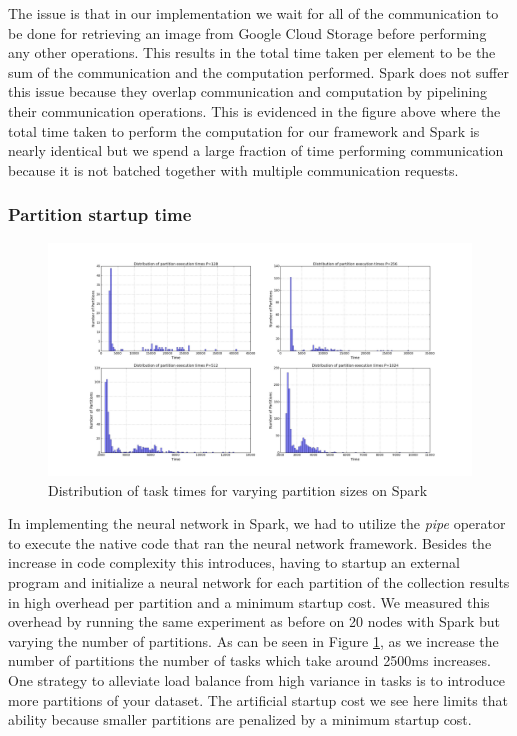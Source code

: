 \documentclass[tog]{acmsiggraph}
\begin{document}
The issue is that in our implementation we wait for all of the communication to
be done for retrieving an image from Google Cloud Storage before performing any
other operations. This results in the total time taken per element to be the
sum of the communication and the computation performed. Spark does not suffer
this issue because they overlap communication and computation by pipelining
their communication operations. This is evidenced in the figure above where the
total time taken to perform the computation for our framework and Spark is
nearly identical but we spend a large fraction of time performing communication
because it is not batched together with multiple communication requests.

\subsubsection{Partition startup time}

\begin{figure}[htp] \centering
\label{fig:scaling}\includegraphics[width=\textwidth]{figures/partition_dist}
\caption{Distribution of task times for varying partition sizes on Spark}
\label{fig:partition}
\end{figure}

In implementing the neural network in Spark, we had to utilize the
\textit{pipe} operator to execute the native code that ran the neural network
framework. Besides the increase in code complexity this introduces, having to
startup an external program and initialize a neural network for each partition
of the collection results in high overhead per partition and a minimum startup
cost. We measured this overhead by running the same experiment as before on 20
nodes with Spark but varying the number of partitions. As can be seen in Figure
\ref{fig:partition}, as we increase the number of partitions the number of
tasks which take around 2500ms increases. One strategy to alleviate load
balance from high variance in tasks is to introduce more partitions of your
dataset. The artificial startup cost we see here limits that ability because
smaller partitions are penalized by a minimum startup cost.
\end{document}
